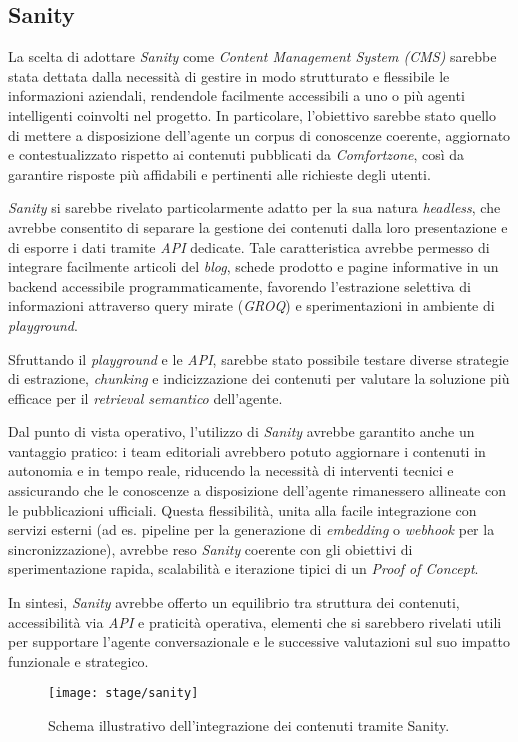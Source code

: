\subsection{Sanity}

La scelta di adottare \emph{Sanity} come \emph{Content Management System (CMS)} sarebbe stata dettata dalla necessità di gestire in modo strutturato e flessibile le informazioni aziendali, 
rendendole facilmente accessibili a uno o più agenti intelligenti coinvolti nel progetto. 
In particolare, l’obiettivo sarebbe stato quello di mettere a disposizione dell’agente un corpus di conoscenze coerente, aggiornato e contestualizzato rispetto ai 
contenuti pubblicati da \emph{Comfortzone}, così da garantire risposte più affidabili e pertinenti alle richieste degli utenti.

\emph{Sanity} si sarebbe rivelato particolarmente adatto per la sua natura \emph{headless}, che avrebbe consentito di separare la gestione dei contenuti dalla loro 
presentazione e di esporre i dati tramite \emph{API} dedicate. Tale caratteristica avrebbe permesso di integrare facilmente articoli del \emph{blog}, 
schede prodotto e pagine informative in un backend accessibile programmaticamente, favorendo l’estrazione selettiva di informazioni attraverso query mirate (\emph{GROQ}) e 
sperimentazioni in ambiente di \emph{playground}.

Sfruttando il \emph{playground} e le \emph{API}, sarebbe stato possibile testare diverse strategie di estrazione, \emph{chunking} e indicizzazione dei contenuti per valutare la soluzione più 
efficace per il \emph{retrieval semantico} dell’agente.

Dal punto di vista operativo, l’utilizzo di \emph{Sanity} avrebbe garantito anche un vantaggio pratico: i team editoriali avrebbero potuto aggiornare i contenuti in autonomia e in tempo reale, 
riducendo la necessità di interventi tecnici e assicurando che le conoscenze a disposizione dell’agente rimanessero allineate con le pubblicazioni ufficiali. Questa flessibilità, 
unita alla facile integrazione con servizi esterni (ad es. pipeline per la generazione di \emph{embedding} o \emph{webhook} per la sincronizzazione), avrebbe reso \emph{Sanity} 
coerente con gli obiettivi di sperimentazione rapida, scalabilità e iterazione tipici di un \emph{Proof of Concept}.

In sintesi, \emph{Sanity} avrebbe offerto un equilibrio tra struttura dei contenuti, accessibilità via \emph{API} e praticità operativa, elementi che si sarebbero rivelati 
utili per supportare l’agente conversazionale e le successive valutazioni sul suo impatto funzionale e strategico.

\begin{figure}[H]
    \centering
    \texttt{[image: stage/sanity]}
    \caption{Schema illustrativo dell’integrazione dei contenuti tramite Sanity.}
    \label{fig:sanity}
\end{figure}